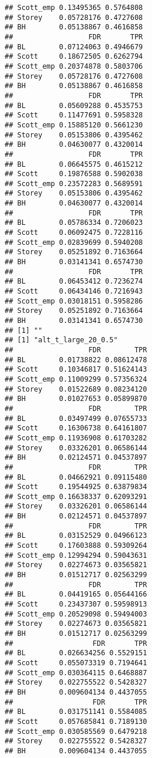 \documentclass{article}\usepackage[]{graphicx}\usepackage[]{color}
\makeatletter
\newenvironment{kframe}{%
 \def\at@end@of@kframe{}%
 \ifinner\ifhmode%
  \def\at@end@of@kframe{\end{minipage}}%
  \begin{minipage}{\columnwidth}%
 \fi\fi%
 \def\FrameCommand##1{\hskip\@totalleftmargin \hskip-\fboxsep
 \colorbox{shadecolor}{##1}\hskip-\fboxsep
     \hskip-\linewidth \hskip-\@totalleftmargin \hskip\columnwidth}%
 \MakeFramed {\advance\hsize-\width
   \@totalleftmargin\z@ \linewidth\hsize
   \@setminipage}}%
 {\par\unskip\endMakeFramed%
 \at@end@of@kframe}
\newenvironment{knitrout}{}{} %
\makeatother
\begin{document}
\begin{knitrout}
\begin{kframe}
\begin{verbatim}
## Scott_emp 0.13495365 0.5764808
## Storey    0.05728176 0.4727608
## BH        0.05138867 0.4616858
##                  FDR       TPR
## BL        0.07124063 0.4946679
## Scott     0.18672505 0.6262794
## Scott_emp 0.20374878 0.5803706
## Storey    0.05728176 0.4727608
## BH        0.05138867 0.4616858
##                  FDR       TPR
## BL        0.05609288 0.4535753
## Scott     0.11477691 0.5958328
## Scott_emp 0.15885120 0.5661230
## Storey    0.05153806 0.4395462
## BH        0.04630077 0.4320014
##                  FDR       TPR
## BL        0.06645575 0.4615212
## Scott     0.19876588 0.5902038
## Scott_emp 0.23572283 0.5689591
## Storey    0.05153806 0.4395462
## BH        0.04630077 0.4320014
##                  FDR       TPR
## BL        0.05786334 0.7206023
## Scott     0.06092475 0.7228116
## Scott_emp 0.02839699 0.5940208
## Storey    0.05251892 0.7163664
## BH        0.03141341 0.6574730
##                  FDR       TPR
## BL        0.06453412 0.7236274
## Scott     0.06434146 0.7216943
## Scott_emp 0.03018151 0.5958286
## Storey    0.05251892 0.7163664
## BH        0.03141341 0.6574730
## [1] ""
## [1] "alt_t_large_20_0.5"
##                  FDR        TPR
## BL        0.01738822 0.08612478
## Scott     0.10346817 0.51624143
## Scott_emp 0.11009299 0.57356324
## Storey    0.01522689 0.08234120
## BH        0.01027653 0.05899870
##                  FDR        TPR
## BL        0.03497499 0.07655733
## Scott     0.16306738 0.64161807
## Scott_emp 0.11936908 0.61703282
## Storey    0.03326201 0.06586144
## BH        0.02124571 0.04537897
##                  FDR        TPR
## BL        0.04662921 0.09115480
## Scott     0.19544925 0.63879834
## Scott_emp 0.16638337 0.62093291
## Storey    0.03326201 0.06586144
## BH        0.02124571 0.04537897
##                  FDR        TPR
## BL        0.03152529 0.04966123
## Scott     0.17603888 0.59309264
## Scott_emp 0.12994294 0.59043631
## Storey    0.02274673 0.03565821
## BH        0.01512717 0.02563299
##                  FDR        TPR
## BL        0.04419165 0.05644166
## Scott     0.23437307 0.59598913
## Scott_emp 0.20529098 0.59494003
## Storey    0.02274673 0.03565821
## BH        0.01512717 0.02563299
##                   FDR       TPR
## BL        0.026634256 0.5529151
## Scott     0.055073319 0.7194641
## Scott_emp 0.030364115 0.6468887
## Storey    0.022755522 0.5428327
## BH        0.009604134 0.4437055
##                   FDR       TPR
## BL        0.031751141 0.5584085
## Scott     0.057685841 0.7189130
## Scott_emp 0.030585569 0.6479218
## Storey    0.022755522 0.5428327
## BH        0.009604134 0.4437055

\end{verbatim}
\end{kframe}
\end{knitrout}
\end{document}
